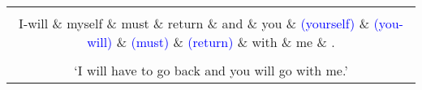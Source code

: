 \documentclass{standalone}  %
\begin{document}
\begin{tabular}{c}
\begin{dependency}[edge unit distance=3ex]
  \begin{deptext}
    Budu \& se \& muset \& vrátit \& a \& ty \& \textcolor{blue}{(se)} \& \textcolor{blue}{(budeš)} \& \textcolor{blue}{(muset)} \& \textcolor{blue}{(vrátit)} \& se \& mnou \& . \\
    I-will \& myself \& must \& return \& and \& you \& \textcolor{blue}{(yourself)} \& \textcolor{blue}{(you-will)} \& \textcolor{blue}{(must)} \& \textcolor{blue}{(return)} \& with \& me \& . \\
  \end{deptext}
  \depedge{3}{1}{aux}
  \depedge[edge unit distance=1.2ex]{3}{13}{punct}
  \depedge[red,label style={red,fill=white,text=red}]{3}{6}{conj}
  \depedge[edge unit distance=6ex]{3}{4}{xcomp}
  \depedge[red,label style={red,fill=white,text=red}]{6}{5}{cc}
  \depedge[red,label style={red,fill=white,text=red},edge unit distance=1ex]{6}{12}{orphan}
  \depedge{12}{11}{case}
  \deproot[edge unit distance=4ex]{3}{root}
  \depedge[edge unit distance=1.5ex]{4}{2}{expl:pv}
  \depedge[edge below]{3}{1}{aux}
  \depedge[edge below,blue,label style={blue,fill=white,text=blue}]{3}{9}{conj:a}
  \depedge[edge below,edge unit distance=6ex]{3}{4}{xcomp}
  \depedge[edge below,blue,label style={blue,fill=white,text=blue},edge unit distance=3.75ex]{9}{5}{cc}
  \depedge[edge below,blue,label style={blue,fill=white,text=blue}]{9}{6}{nsubj}
  \depedge[edge below,blue,label style={blue,fill=white,text=blue}]{9}{10}{xcomp}
  \depedge[edge below,blue,label style={blue,fill=white,text=blue}]{10}{12}{obl:s}
  \depedge[edge below]{12}{11}{case}
  \deproot[edge below,edge unit distance=6ex]{3}{root}
  \deproot[edge below,draw=blue,fill=white,text=blue,label style={fill=white,text=blue},edge unit distance=6ex]{9}{root}
  \depedge[edge below,edge unit distance=2.1ex]{3}{13}{punct}
  \depedge[edge below,edge unit distance=1.5ex]{4}{2}{expl:pv}
  \depedge[edge below,blue,label style={blue,fill=white,text=blue}]{10}{6}{nsubj:xsubj}
  \depedge[edge below,blue,label style={blue,fill=white,text=blue}]{9}{8}{aux}
  \depedge[edge below,blue,label style={blue,fill=white,text=blue},edge unit distance=2ex]{10}{7}{expl:pv}
\end{dependency} \\
`I will have to go back and you will go with me.' \\
\end{tabular}
\end{document}
